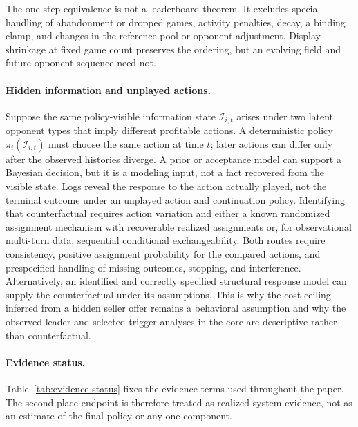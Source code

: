 The one-step equivalence is not a leaderboard theorem. It excludes special
handling of abandonment or dropped games, activity penalties, decay, a binding
clamp, and changes in the reference pool or opponent adjustment. Display
shrinkage at fixed game count preserves the ordering, but an evolving field and
future opponent sequence need not.

\paragraph{Hidden information and unplayed actions.}
Suppose the same policy-visible information state $\mathcal I_{i,t}$ arises
under two latent opponent types that imply different profitable actions. A
deterministic policy $\pi_i(\mathcal I_{i,t})$ must choose the same action at
time $t$; later actions can differ only after the observed histories diverge. A
prior or acceptance model can support a Bayesian
decision, but it is a modeling input, not a fact recovered from the visible
state. Logs reveal the response to the action actually played, not the terminal
outcome under an unplayed action and continuation policy. Identifying that
counterfactual requires action variation and either a known randomized
assignment mechanism with recoverable realized assignments or, for
observational multi-turn data, sequential conditional exchangeability. Both
routes require consistency, positive assignment probability for the compared
actions, and prespecified handling of missing outcomes, stopping, and
interference. Alternatively, an identified and correctly specified structural
response model can supply the counterfactual under its assumptions. This is why
the cost ceiling inferred from a hidden seller offer remains a behavioral
assumption and why the observed-leader and selected-trigger analyses in the core
are descriptive rather than counterfactual.

\paragraph{Evidence status.}
Table~\ref{tab:evidence-status} fixes the evidence terms used throughout the
paper. The second-place endpoint is therefore treated as realized-system
evidence, not as an estimate of the final policy or any one component.

